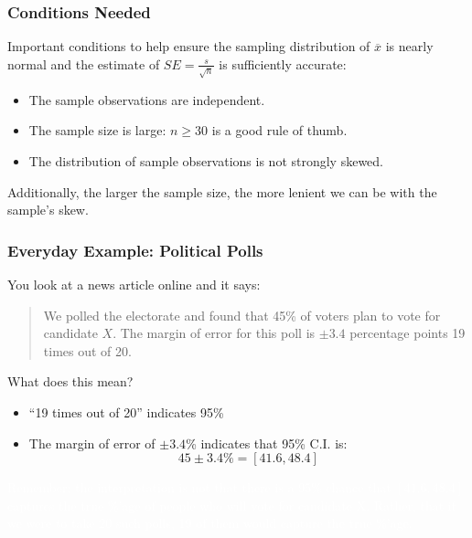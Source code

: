 \documentclass[handout]{beamer}
\newcommand{\blue}[1]{\textcolor{blue2}{#1}}
\newcommand{\xbar}{\overline{x}}
\begin{document}
\begin{frame}
\frametitle{Conditions Needed}
Important conditions to help ensure the sampling distribution of $\xbar$ is nearly normal
and the estimate of $SE=\frac{s}{\sqrt n}$ is sufficiently accurate:
\begin{itemize}
\pause \item The sample observations are independent.
\pause \item The sample size is large: $n \geq 30$ is a good rule of thumb.
\pause \item The distribution of sample observations is not strongly skewed.
\end{itemize}

\pause Additionally, the larger the sample size, the more lenient we can be with the
sample's skew.

\end{frame}


\begin{frame}
\frametitle{Everyday Example:  Political Polls}
You look at a news article online and it says:
\begin{quotation}
\noindent We polled the electorate and found that 45\% of voters plan to vote for candidate $X$.  The margin of error for this poll is $\pm 3.4$ percentage points 19 times out of 20.  
\end{quotation}
\pause What does this mean?
\begin{itemize}
\pause \item ``19 times out of 20'' indicates 95\%
\pause \item The \blue{margin of error} of $\pm 3.4$\% indicates that 95\% C.I. is:
\[45 \pm 3.4 \% = [41.6, 48.4]\]
\end{itemize}
\textcolor{white}{Remember: the interpretation is not that there is a 95\% chance that $[41.6, 48.4]$ captures the true \%'age of people who will vote for candidate X.  Rather, that if we were to take 20 such polls, 19 of them would capture the true \%'age.}
\end{frame}
\end{document}
